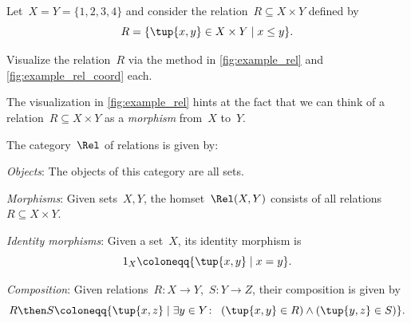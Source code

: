 \begin{exercise}
Let~$X = Y = \{1, 2, 3, 4 \}$ and consider the relation~$R \subseteq X \times Y$ defined by
\begin{equation}
R = \{ \tup{x,y} \in X \times Y \mid x \leq y \}.
\end{equation}

Visualize the relation~$R$ via the method in \cref{fig:example_rel} and \cref{fig:example_rel_coord} each.
\end{exercise}

The visualization in \cref{fig:example_rel} hints at the fact that we can think of a relation~$R \subseteq X \times Y$ as a \emph{morphism} from~$X$ to~$Y$.

\begin{definition}
    The category~$\Rel$ of relations is given by:
    \begin{compactenum}
    \item \emph{Objects}: The objects of this category are all sets.
    \item \emph{Morphisms}: Given sets~$X, Y$, the homset~$\Rel(X,Y)$ consists of all
    relations~$R\subseteq X\times Y$.
    \item \emph{Identity morphisms}: Given a set~$X$, its identity morphism is
  	\begin{equation}
	1_X \coloneqq \{ \tup{x,y} \mid  x = y \}.
	\end{equation}
    \item \emph{Composition}: Given relations~$R \colon X\to Y$,~$S\colon Y\to Z$, their composition is given by
    \begin{equation}\label{RelCompRule}
    R \then S \coloneqq \{\tup{x,z} \mid  \exists y \in Y \colon \ \left(\tup{x,y} \in R\right) \wedge \left(\tup{y,z} \in S\right)\}.
    \end{equation}
\end{compactenum}
\end{definition}


